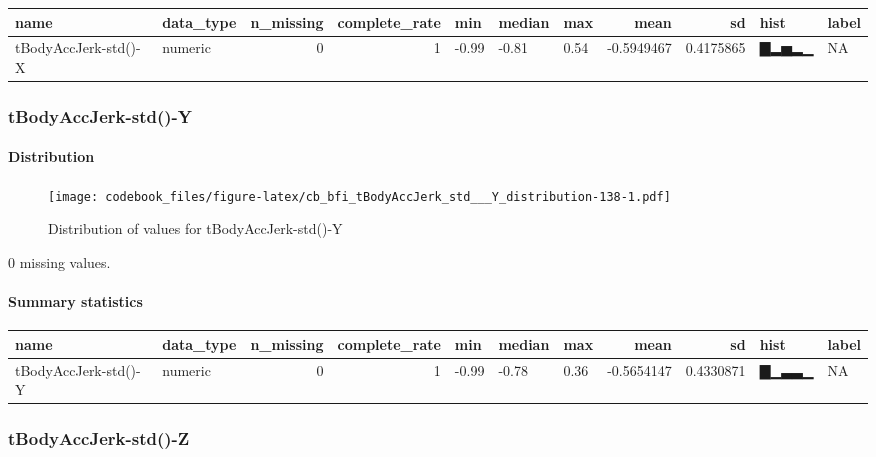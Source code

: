 \documentclass[
]{article}
\begin{document}
\begin{longtable}[]{@{}llrrlllrrll@{}}
\toprule
name & data\_type & n\_missing & complete\_rate & min & median & max &
mean & sd & hist & label \\
\midrule
\endhead
tBodyAccJerk-std()-X & numeric & 0 & 1 & -0.99 & -0.81 & 0.54 &
-0.5949467 & 0.4175865 & ▇▂▅▂▁ & NA \\
\bottomrule
\end{longtable}

\hypertarget{tBodyAccJerk_std___Y}{%
\subsubsection{tBodyAccJerk-std()-Y}\label{tBodyAccJerk_std___Y}}

\hypertarget{tBodyAccJerk_std___Y_distribution}{%
\paragraph{Distribution}\label{tBodyAccJerk_std___Y_distribution}}

\begin{figure}
\centering
\texttt{[image: codebook\_files/figure-latex/cb\_bfi\_tBodyAccJerk\_std\_\_\_Y\_distribution-138-1.pdf]}
\caption{Distribution of values for tBodyAccJerk-std()-Y}
\end{figure}

0 missing values.

\hypertarget{tBodyAccJerk_std___Y_summary}{%
\paragraph{Summary statistics}\label{tBodyAccJerk_std___Y_summary}}

\begin{longtable}[]{@{}llrrlllrrll@{}}
\toprule
name & data\_type & n\_missing & complete\_rate & min & median & max &
mean & sd & hist & label \\
\midrule
\endhead
tBodyAccJerk-std()-Y & numeric & 0 & 1 & -0.99 & -0.78 & 0.36 &
-0.5654147 & 0.4330871 & ▇▁▃▃▁ & NA \\
\bottomrule
\end{longtable}

\hypertarget{tBodyAccJerk_std___Z}{%
\subsubsection{tBodyAccJerk-std()-Z}\label{tBodyAccJerk_std___Z}}
\end{document}
